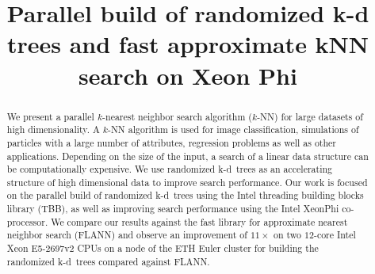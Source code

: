 \documentclass[letterpaper]{article}
\title{Parallel build of randomized k-d trees and fast approximate kNN search on Xeon Phi}
\begin{document}
\maketitle

\begin{abstract}
  We present a parallel $k$-nearest neighbor search algorithm ($k$-NN) for 
  large datasets of high dimensionality.  A $k$-NN algorithm is used for image 
  classification, simulations of particles with a large number of attributes, 
  regression problems as well as other applications.  Depending on the size of 
  the input, a search of a linear data structure can be computationally 
  expensive.  We use randomized k-d~trees as an accelerating structure of high 
  dimensional data to improve search performance.   Our work is focused on the 
  parallel build of randomized k-d~trees using the Intel threading building 
  blocks library (TBB), as well as improving search performance using the Intel 
  XeonPhi co-processor.  We compare our results against the fast library for 
  approximate nearest neighbor search (FLANN) and observe an improvement of 
  $11\times$ on two $12$-core Intel Xeon E5-2697v2 CPUs on a node of the ETH 
  Euler cluster for building the randomized k-d~trees compared against FLANN.  


  \end{abstract}

  
  
  
  
  
  

  
  
\end{document}
